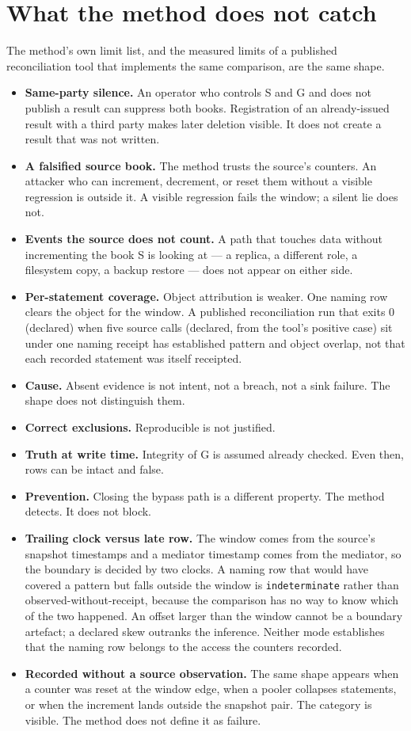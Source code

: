 \documentclass[11pt]{article}
\begin{document}
\section{What the method does not catch}

The method's own limit list, and the measured limits of a published reconciliation tool that implements the same comparison, are the same shape.

\begin{itemize}
\item \textbf{Same-party silence.} An operator who controls S and G and does not publish a result can suppress both books. Registration of an already-issued result with a third party makes later deletion visible. It does not create a result that was not written.
\item \textbf{A falsified source book.} The method trusts the source's counters. An attacker who can increment, decrement, or reset them without a visible regression is outside it. A visible regression fails the window; a silent lie does not.
\item \textbf{Events the source does not count.} A path that touches data without incrementing the book S is looking at --- a replica, a different role, a filesystem copy, a backup restore --- does not appear on either side.
\item \textbf{Per-statement coverage.} Object attribution is weaker. One naming row clears the object for the window. A published reconciliation run that exits 0 (declared) when five source calls (declared, from the tool's positive case) sit under one naming receipt has established pattern and object overlap, not that each recorded statement was itself receipted.
\item \textbf{Cause.} Absent evidence is not intent, not a breach, not a sink failure. The shape does not distinguish them.
\item \textbf{Correct exclusions.} Reproducible is not justified.
\item \textbf{Truth at write time.} Integrity of G is assumed already checked. Even then, rows can be intact and false.
\item \textbf{Prevention.} Closing the bypass path is a different property. The method detects. It does not block.
\item \textbf{Trailing clock versus late row.} The window comes from the source's snapshot timestamps and a mediator timestamp comes from the mediator, so the boundary is decided by two clocks. A naming row that would have covered a pattern but falls outside the window is \texttt{indeterminate} rather than observed-without-receipt, because the comparison has no way to know which of the two happened. An offset larger than the window cannot be a boundary artefact; a declared skew outranks the inference. Neither mode establishes that the naming row belongs to the access the counters recorded.
\item \textbf{Recorded without a source observation.} The same shape appears when a counter was reset at the window edge, when a pooler collapses statements, or when the increment lands outside the snapshot pair. The category is visible. The method does not define it as failure.
\end{itemize}
\end{document}
